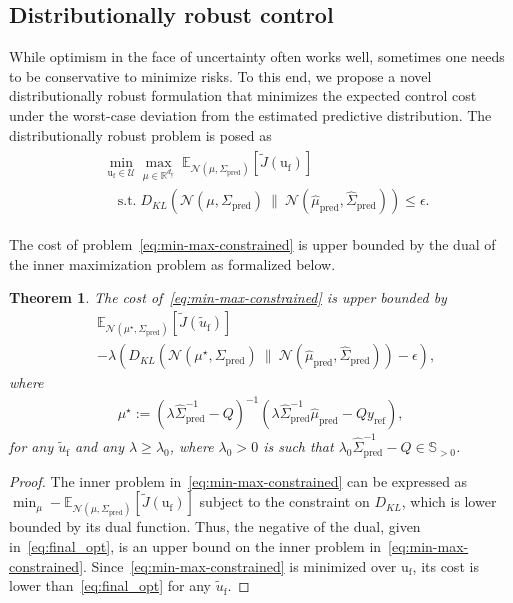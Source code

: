 \documentclass[letterpaper, 10 pt, conference]{ieeeconf}
\def\ufr{\mathrm{u}_\mathrm{f}}
\def\yr{y_\mathrm{ref}}
\def\mph{\hat{\mu}_\mathrm{pred}}
\def\Sp{\Sigma_\mathrm{pred}}
\def\Sph{\hat{\Sigma}_\mathrm{pred}}
\def\dy{d_\mathrm{y}}
\def\uft{\tilde{u}_\mathrm{f}}
\newtheorem{thm}{Theorem}
\begin{document}
\subsection{Distributionally robust control}
While optimism in the face of uncertainty often works well, sometimes one needs to be conservative to minimize risks.
To this end, we propose a novel distributionally robust formulation that minimizes the expected control cost under the worst-case deviation from the estimated predictive distribution.
The distributionally robust problem is posed as
\begin{align} \label{eq:min-max-constrained}
    \begin{split}
    & \min_{\ufr \in \mathcal{U}} \max_{\mu\in\mathbb{R}^{\dy}} \;  \mathbb{E}_{\mathcal{N}(\mu,\Sp)}[\tilde{J}(\ufr)] \\
    & \quad  \mathrm{s.t.} \; D_{KL}\left(\mathcal{N}(\mu,\Sp)~\big\|~\mathcal{N}\left(\mph,\Sph\right) \right) \leq \epsilon.
    \end{split}
\end{align}


The cost of problem~\eqref{eq:min-max-constrained} is upper bounded by the dual of the inner maximization problem as formalized below.
\begin{thm} \label{thm:final}
    The cost of~\eqref{eq:min-max-constrained} is upper bounded by
    \begin{align} \label{eq:final_opt}
        & \mathbb{E}_{\mathcal{N}(\mu^\star,\Sp)}[\tilde{J}(\uft)] \\
    & -\lambda\left( D_{KL}\left(\mathcal{N}(\mu^\star,\Sp)~\big\|~\mathcal{N}(\mph,\Sph)\right) - \epsilon\right), \nonumber
    \end{align}
    where
    \begin{align*} 
        \mu^\star := (\lambda \Sph^{-1}-Q)^{-1}(\lambda\Sph^{-1}\mph -Q\yr),
    \end{align*}
    for any $\uft$ and any $\lambda\geq\lambda_0$, where $\lambda_0>0$ is such that $\lambda_0\Sph^{-1}-Q\in\mathbb{S}_{>0}$.
\end{thm}
\begin{proof}
    The inner problem in~\eqref{eq:min-max-constrained} can be expressed as $\min_{\mu}-\mathbb{E}_{\mathcal{N}(\mu,\Sp)}[\tilde{J}(\ufr)]$ subject to the constraint on $D_{KL}$, which is lower bounded by its dual function. Thus, the negative of the dual, given in~\eqref{eq:final_opt}, is an upper bound on the inner problem in~\eqref{eq:min-max-constrained}.
    Since~\eqref{eq:min-max-constrained} is minimized over $\ufr$, its cost is lower than~\eqref{eq:final_opt} for any $\uft$.
\end{proof}
\end{document}

